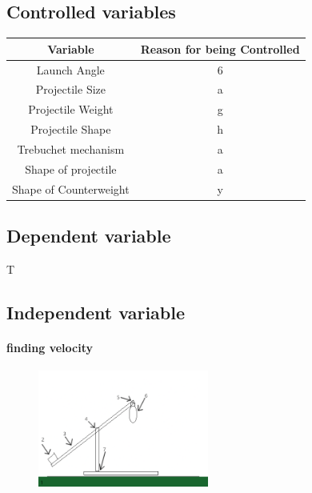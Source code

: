 \documentclass[12pt]{article}
\begin{document}
\subsection{Controlled variables}
\begin{center}
\begin{tabular}{||c c||}
 \hline
 Variable & Reason for being Controlled  \\ [0.5ex]
 \hline\hline
 Launch Angle & 6  \\
 \hline
 Projectile Size & a \\
 \hline
 Projectile Weight & g \\
 \hline
 Projectile Shape & h \\
 \hline
  Trebuchet mechanism & a \\
 \hline
  Shape of projectile & a \\
  \hline
  Shape of Counterweight & y \\
  \hline
\end{tabular}
\end{center}

\subsection{Dependent variable}
T
\subsection{Independent variable}

\paragraph{finding velocity}
\begin{figure} %
  \centering
  \includegraphics[width=0.5\textwidth]{cataaa}
\end{figure}
\end{document}
